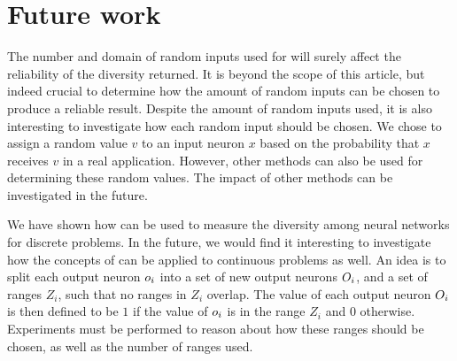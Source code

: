 \section{Future work}\label{sec:futurework}
The number and domain of random inputs used for \dia{} will surely affect the reliability of the diversity returned.
It is beyond the scope of this article, but indeed crucial to determine how the amount of random inputs can be chosen to produce a reliable result.
Despite the amount of random inputs used, it is also interesting to investigate how each random input should be chosen.
We chose to assign a random value $v$ to an input neuron $x$ based on the probability that $x$ receives $v$ in a real application.
However, other methods can also be used for determining these random values.
The impact of other methods can be investigated in the future. 

We have shown how \dia{} can be used to measure the diversity among neural networks for discrete problems. In the future, we would find it interesting to investigate how the concepts of \dia{} can be applied to continuous problems as well. An idea is to split each output neuron $o_i$ into a set of new output neurons $O_i$, and a set of ranges $Z_i$, such that no ranges in $Z_i$ overlap. The value of each output neuron $O_i$ is then defined to be $1$ if the value of $o_i$ is in the range $Z_i$ and 0 otherwise. Experiments must be performed to reason about how these ranges should be chosen, as well as the number of ranges used.
